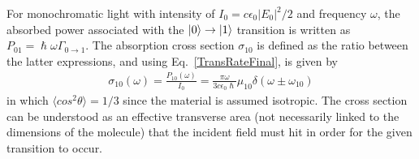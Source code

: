 For monochromatic light with intensity of $I_0 = c \epsilon_0 |E_0|^2 /2$ and frequency $\omega$, the absorbed power associated with the $\ket{0} \to \ket{1}$ transition is written as $P_\text{01} = \hslash \omega \Gamma_{0 \to 1}$. The absorption cross section $\sigma_\text{10}$ is defined as the ratio between the latter expressions, and using Eq.\ \ref{TransRateFinal}, is given by
\begin{eqnarray}
\sigma_\text{10} (\omega) = \frac{P_\text{10} (\omega) }{I_0} =  \frac{\pi \omega }{3 c \epsilon_0 \hslash } \mu_{10} \delta(\omega \pm \omega_{10})
\label{crosssection}
\end{eqnarray}
in which $\langle cos^2 \theta \rangle = 1/3 $ since the material is assumed isotropic. The cross section can be understood as an effective transverse area (not necessarily linked to the dimensions of the molecule) that the incident field must hit in order for the given transition to occur.

